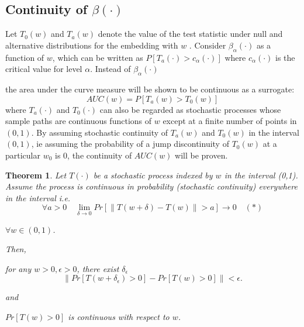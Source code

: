 \documentclass[11pt]{article} %
\newtheorem{thm}{Theorem}
\begin{document}
 
\subsection{Continuity of $\beta(\cdot)$} 
 Let $T_0(w)$ and $T_a(w)$ denote the value of the test statistic under null and alternative distributions  for the embedding with $w$ .  %
Consider $\beta_{\alpha}(\cdot)$ as a function of $w$, which can be written as $P\left[T_a(\cdot)>c_{\alpha}(\cdot)\right]$ where $c_{\alpha}(\cdot)$ is the critical value for level $\alpha$. Instead of  $\beta_{\alpha}(\cdot)$

  the area under the curve measure will be shown to be continuous as a surrogate: $$AUC(w)=P\left[T_a(w)>T_0(w)\right]$$ where $T_a(\cdot)$ and $T_0(\cdot)$ can also be regarded as  stochastic processes whose sample paths are continuous functions of $w$ except at a finite number of points in $(0,1)$. By  assuming stochastic continuity of $T_a(w)$ and $T_0(w)$ in the interval $(0,1)$, ie assuming the probability of a jump discontinuity of $T_0(w)$ at a particular $w_0$ is 0,  the continuity of $AUC(w)$ will be proven.


\begin{thm}
Let $T(\cdot)$ be  a stochastic process indexed by $w$ in the interval (0,1). Assume  the process is continuous in probability  (stochastic continuity)   everywhere in the interval  i.e.
$$ \forall a>0 \quad  \lim_{\delta \rightarrow 0} Pr\left[\|T(w+\delta)-T(w) \|>a \right] \rightarrow 0 \quad(*)$$ 

 $\forall w\in (0,1)$.

Then,

for any $w>0, \epsilon>0$, there exist $\delta_{\epsilon}$ $$\| Pr\left[T(w+\delta_{\epsilon})>0 \right]- Pr\left[T(w)>0 \right]\|<\epsilon .  $$

and 

$Pr \left[ T(w)>0\right]$ is continuous with respect to $w$.
\end{thm}
\end{document}
